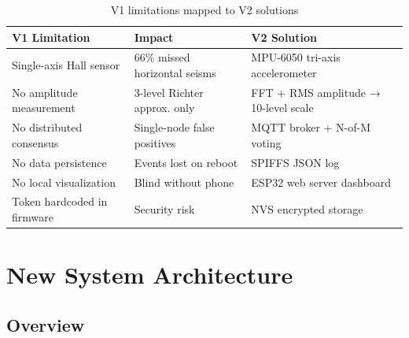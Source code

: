 \documentclass[11pt,a4paper]{article}
\begin{document}
\begin{table}[h!]
\centering
\begin{tabular}{p{4.5cm}p{4cm}p{5cm}}
\toprule
\textbf{V1 Limitation} & \textbf{Impact} & \textbf{V2 Solution} \\
\midrule
Single-axis Hall sensor & 66\% missed horizontal seisms & MPU-6050 tri-axis accelerometer \\
No amplitude measurement & 3-level Richter approx. only & FFT + RMS amplitude → 10-level scale \\
No distributed consensus & Single-node false positives & MQTT broker + N-of-M voting \\
No data persistence & Events lost on reboot & SPIFFS JSON log \\
No local visualization & Blind without phone & ESP32 web server dashboard \\
Token hardcoded in firmware & Security risk & NVS encrypted storage \\
\bottomrule
\end{tabular}
\caption{V1 limitations mapped to V2 solutions}
\end{table}

\section{New System Architecture}

\subsection{Overview}
\end{document}
